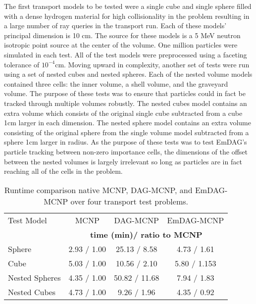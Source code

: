 The first transport models to be tested were a single cube and single sphere
filled with a dense hydrogen material for high collisionality in the problem
resulting in a large number of ray queries in the transport run. Each of these
models' principal dimension is 10 cm. The source for these models is a 5 MeV
neutron isotropic point source at the center of the volume. One million
particles were simulated in each test. All of the test models were preprocessed
using a faceting tolerance of $10^{-4}$cm. Moving upward in complexity, another
set of tests were run using a set of nested cubes and nested spheres. Each of
the nested volume models contained three cells: the inner volume, a shell
volume, and the graveyard volume. The purpose of these tests was to ensure that
particles could in fact be tracked through multiple volumes robustly. The nested
cubes model contains an extra volume which consists of the original single cube
subtracted from a cube 1cm larger in each dimension. The nested sphere model
contains an extra volume consisting of the original sphere from the single
volume model subtracted from a sphere 1cm larger in radius. As the purpose of
these tests was to test EmDAG's particle tracking between non-zero importance
cells, the dimensions of the offset between the nested volumes is largely
irrelevant so long as particles are in fact reaching all of the cells in the problem.

\begin{table}[H]
  \small
  \begin{center}
    
    \begin{tabular}{lccc}

      \toprule
      Test Model & MCNP & DAG-MCNP & EmDAG-MCNP \\
      & \multicolumn{3}{c}{\textbf{time (min)/ ratio to MCNP}} \\
      \hline
      Sphere & 2.93 / 1.00 & 25.13 / 8.58  & 4.73 / 1.61  \\
      Cube & 5.03 / 1.00 & 10.56 / 2.10 & 5.80 / 1.153 \\
      Nested Spheres & 4.35 / 1.00  & 50.82 / 11.68  & 7.94 / 1.83 \\
      Nested Cubes & 4.73 / 1.00 & 9.26 / 1.96 & 4.35 / 0.92 \\
      \bottomrule
      
    \end{tabular}
  \end{center}
  \caption{Runtime comparison native MCNP, DAG-MCNP, and EmDAG-MCNP over four
    transport test problems.}
      \label{timings}
\end{table}

